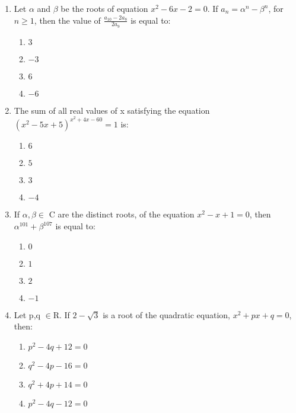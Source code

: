 \begin{enumerate}[label=\arabic*.,ref=\thesubsection.\theenumi]
\item Let $\alpha$ and $\beta$ be the roots of equation $x^2-6x-2=0$. If $a_n=\alpha^n-\beta^n$, for $n\geq1$, then the value of $\frac{a_{10}-2a_8}{2a_9}$ is equal to:
\begin{enumerate}
\item $3$
\item $-3$
\item $6$
\item $-6$ 
\end{enumerate}

\item The sum of all real values of x satisfying the equation $(x^2-5x+5)^{x^2+4x-60}=1$ is:
\begin{enumerate}
\item $6$
\item $5$
\item $3$
\item $-4$ 
\end{enumerate}

\item If $\alpha,\beta\in$ C are the distinct roots, of the equation $x^2-x+1=0$, then $\alpha^{101}+\beta^{107}$ is equal to:
\begin{enumerate}
\item $0$
\item $1$
\item $2$
\item $-1$ 
\end{enumerate}

\item Let p,q $\in$R. If $2-\sqrt{3}$ is a root of the quadratic equation, $x^2+px+q=0$, then:
\begin{enumerate}
\item $p^2-4q+12 = 0$
\item $q^2-4p-16 = 0$
\item $q^2+4p+14 = 0$
\item $p^2-4q-12 = 0$
\end{enumerate}
\end{enumerate}
